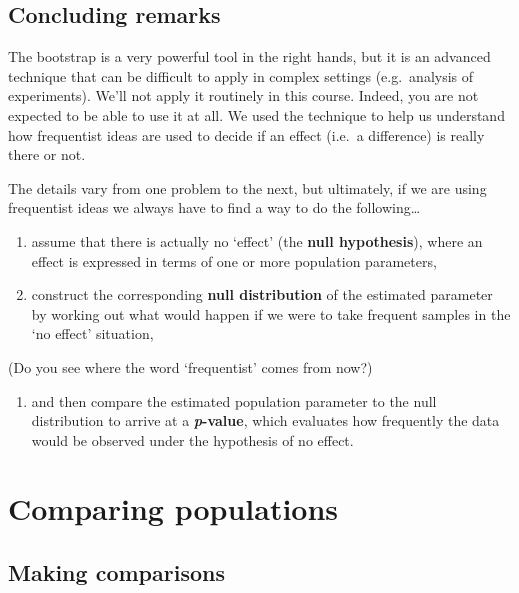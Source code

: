 \documentclass[]{book}
\providecommand{\tightlist}{%
  \setlength{\itemsep}{0pt}\setlength{\parskip}{0pt}}
\begin{document}
\section{Concluding remarks}\label{concluding-remarks}

The bootstrap is a very powerful tool in the right hands, but it is an
advanced technique that can be difficult to apply in complex settings
(e.g.~analysis of experiments). We'll not apply it routinely in this
course. Indeed, you are not expected to be able to use it at all. We
used the technique to help us understand how frequentist ideas are used
to decide if an effect (i.e.~a difference) is really there or not.

The details vary from one problem to the next, but ultimately, if we are
using frequentist ideas we always have to find a way to do the
following\ldots{}

\begin{enumerate}
\def\labelenumi{\arabic{enumi}.}
\item
  assume that there is actually no `effect' (the \textbf{null
  hypothesis}), where an effect is expressed in terms of one or more
  population parameters,
\item
  construct the corresponding \textbf{null distribution} of the
  estimated parameter by working out what would happen if we were to
  take frequent samples in the `no effect' situation,
\end{enumerate}

(Do you see where the word `frequentist' comes from now?)

\begin{enumerate}
\def\labelenumi{\arabic{enumi}.}
\setcounter{enumi}{2}
\tightlist
\item
  and then compare the estimated population parameter to the null
  distribution to arrive at a \textbf{\emph{p}-value}, which evaluates
  how frequently the data would be observed under the hypothesis of no
  effect.
\end{enumerate}

\hypertarget{comparing-populations}{\chapter{Comparing
populations}\label{comparing-populations}}

\section{Making comparisons}\label{making-comparisons}
\end{document}
